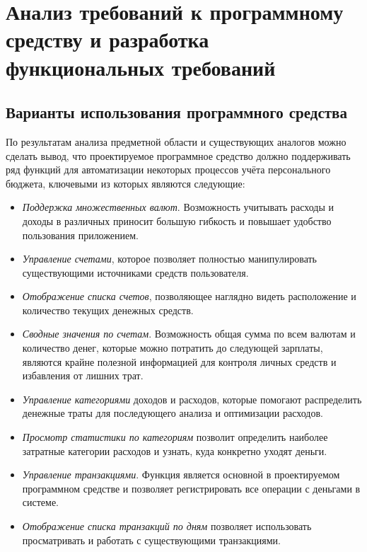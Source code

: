 \section{Анализ требований к программному средству и разработка функциональных требований}
\label{sec:domain}

\subsection{Варианты использования программного средства}
\label{sec:domain:use_cases}

По результатам анализа предметной области и существующих аналогов можно сделать вывод, что проектируемое программное средство должно поддерживать ряд функций для автоматизации некоторых процессов учёта персонального бюджета, ключевыми из которых являются следующие:

\begin{itemize}
    \item \emph{Поддержка множественных валют}.
    Возможность учитывать расходы и доходы в различных приносит большую гибкость и повышает удобство пользования приложением.
    \item \emph{Управление счетами}, которое позволяет полностью манипулировать существующими источниками средств пользователя.
    \item \emph{Отображение списка счетов}, позволяющее наглядно видеть расположение и количество текущих денежных средств.
    \item \emph{Сводные значения по счетам}.
    Возможность общая сумма по всем валютам и количество денег, которые можно потратить до следующей зарплаты, являются крайне полезной информацией для контроля личных средств и избавления от лишних трат.
    \item \emph{Управление категориями} доходов и расходов, которые помогают распределить денежные траты для последующего анализа и оптимизации расходов.
    \item \emph{Просмотр статистики по категориям} позволит определить наиболее затратные категории расходов и узнать, куда конкретно уходят деньги.
    \item \emph{Управление транзакциями}.
    Функция является основной в проектируемом программном средстве и позволяет регистрировать все операции с деньгами в системе.
    \item \emph{Отображение списка транзакций по дням} позволяет использовать просматривать и работать с существующими транзакциями.
\end{itemize}

